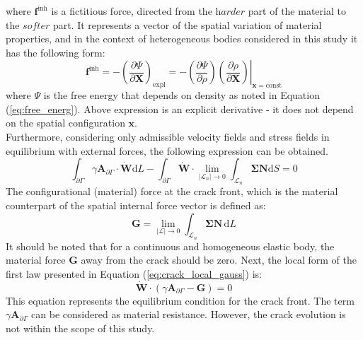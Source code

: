 \documentclass[11pt]{ACMEarticle}
\numberwithin{equation}{section}
\begin{document}
where $ \mathbf f^{\mathrm {inh}}$ is a fictitious force, directed from the $ \textit {harder}$ part of the material to the $ \textit {softer}$ part. It represents a vector of the spatial variation of material properties, and in the context of heterogeneous bodies considered in this study it has the following form:
\begin{equation}
\mathbf f^{\mathrm {inh}} = - \left( \frac{\partial \Psi }{ \partial \mathbf X} \right)_{\mathrm{expl}} = - \left. \left( \frac{\partial \Psi}{\partial \rho} \right) \left( \frac{\partial \rho}{\partial \mathbf X} \right) \right|_{\mathbf x= \mathrm{const}}
\end{equation}
where $\Psi$ is the free energy that depends on density as noted in Equation (\ref{eq:free_energ}). Above expression is an explicit derivative - it does not depend on the spatial configuration $\mathbf x$. \\
Furthermore, considering only admissible velocity fields and stress fields in equilibrium with external forces, the following expression can be obtained. 
\begin{equation}
\int_{\partial \Gamma } \gamma \mathbf A_{\partial \Gamma} \cdot \mathbf{\dot W} \mathrm d L -\int_{\partial \Gamma} \mathbf{\dot W} \cdot \lim_{|\mathcal L_n| \to 0 }  \int_{\mathcal L_n } \mathbf{\Sigma N} \mathrm d S  = 0
\end{equation}
The configurational (material) force at the crack front, which is the material counterpart of the spatial internal force vector is defined as:
\begin{equation}
\mathbf G = \lim_{|\mathcal{ L }|\to 0} \int_{\mathcal L_n} \mathbf{ \Sigma N}\, \mathrm d L 
\label{eq:crack_configuration_force}
\end{equation}
It should be noted that for a continuous and homogeneous elastic body, the material force $\mathbf G$ away from the crack should be zero.
Next, the local form of the first law presented in Equation (\ref{eq:crack_local_gauss}) is: 
\begin{equation}\label{eq:crack_local_first_law}
\mathbf{\dot W} \cdot \left( \gamma \mathbf A_{\partial \Gamma} - \mathbf G \right) = 0
\end{equation}
This equation represents the equilibrium condition for the crack front. The term $ \gamma \mathbf A_{ \partial \Gamma }$ can be considered as material resistance. However, the crack evolution is not within the scope of this study. \\
\end{document}
